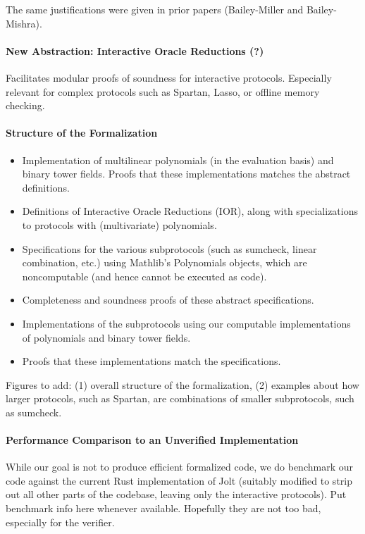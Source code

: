 The same justifications were given in prior papers (Bailey-Miller and Bailey-Mishra).


\paragraph{New Abstraction: Interactive Oracle Reductions (?)}


Facilitates modular proofs of soundness for interactive protocols. Especially relevant for complex protocols such as Spartan, Lasso, or offline memory checking.



\paragraph{Structure of the Formalization}

\begin{itemize}
    \item Implementation of multilinear polynomials (in the evaluation basis) and binary tower fields. Proofs that these implementations matches the abstract definitions.
    \item Definitions of Interactive Oracle Reductions (IOR), along with specializations to protocols with (multivariate) polynomials.
    \item Specifications for the various subprotocols (such as sumcheck, linear combination, etc.) using Mathlib's Polynomials objects, which are noncomputable (and hence cannot be executed as code).
    \item Completeness and soundness proofs of these abstract specifications.
    \item Implementations of the subprotocols using our computable implementations of polynomials and binary tower fields.
    \item Proofs that these implementations match the specifications.
\end{itemize}

{\color{red} Figures to add: (1) overall structure of the formalization, (2) examples about how larger protocols, such as Spartan, are combinations of smaller subprotocols, such as sumcheck.}



\paragraph{Performance Comparison to an Unverified Implementation} While our goal is not to produce efficient formalized code, we do benchmark our code against the current Rust implementation of Jolt (suitably modified to strip out all other parts of the codebase, leaving only the interactive protocols). {\color{red} Put benchmark info here whenever available. Hopefully they are not too bad, especially for the verifier.}

